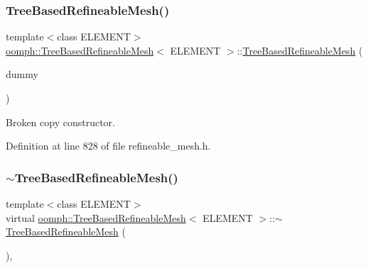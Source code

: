 \subsubsection{\texorpdfstring{Tree\+Based\+Refineable\+Mesh()}{TreeBasedRefineableMesh()}\hspace{0.1cm}{\footnotesize\ttfamily [2/2]}}
{\footnotesize\ttfamily template$<$class E\+L\+E\+M\+E\+NT$>$ \\
\hyperlink{classoomph_1_1TreeBasedRefineableMesh}{oomph\+::\+Tree\+Based\+Refineable\+Mesh}$<$ E\+L\+E\+M\+E\+NT $>$\+::\hyperlink{classoomph_1_1TreeBasedRefineableMesh}{Tree\+Based\+Refineable\+Mesh} (\begin{DoxyParamCaption}\item[{const \hyperlink{classoomph_1_1TreeBasedRefineableMesh}{Tree\+Based\+Refineable\+Mesh}$<$ E\+L\+E\+M\+E\+NT $>$ \&}]{dummy }\end{DoxyParamCaption})\hspace{0.3cm}{\ttfamily [inline]}}



Broken copy constructor. 



Definition at line 828 of file refineable\+\_\+mesh.\+h.

\mbox{\label{classoomph_1_1TreeBasedRefineableMesh_a0c7736c1b102c3699fdad63f2858492f}} 
\subsubsection{\texorpdfstring{$\sim$\+Tree\+Based\+Refineable\+Mesh()}{~TreeBasedRefineableMesh()}}
{\footnotesize\ttfamily template$<$class E\+L\+E\+M\+E\+NT$>$ \\
virtual \hyperlink{classoomph_1_1TreeBasedRefineableMesh}{oomph\+::\+Tree\+Based\+Refineable\+Mesh}$<$ E\+L\+E\+M\+E\+NT $>$\+::$\sim$\hyperlink{classoomph_1_1TreeBasedRefineableMesh}{Tree\+Based\+Refineable\+Mesh} (\begin{DoxyParamCaption}{ }\end{DoxyParamCaption})\hspace{0.3cm}{\ttfamily [inline]}, {\ttfamily [virtual]}}




